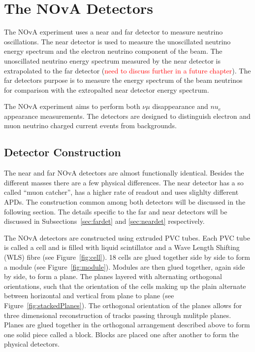 \section{The NOvA Detectors}

The NOvA experiment uses a near and far detector to measure neutrino
oscillations. The near detector is used to measure the unoscillated
neutrino energy spectrum and the electron neutrino component of the
beam. The unoscillated neutrino energy spectrum measured by the near
detector is extrapolated to the far detector (\textcolor{red}{need to
  discuss further in a future chapter}). The far detectors purpose is
to measure the energy spectrum of the beam neutrinos for comparison
with the extropalted near detector energy spectrum.

The NOvA experiment aims to perform both $\nu{\mu}$ disappearance and
$nu_e$ appearance measurements. The
detectors are designed to distinguish electron and muon neutrino
charged current events from backgrounds. 


\subsection{Detector Construction}

The near and far NOvA detectors are almost functionally
identical. Besides
the different masses there are a few physical
differences. The near detector has a so called ``muon catcher'', has a
higher rate of readout and uses slighlty different APDs. The
construction common among both detectors will be discussed in the
following section. The details specific to the far and near detectors
will be discussed in Subsections~\ref{sec:fardet} and
\ref{sec:neardet} respectively.

The NOvA detectors are constructed using extruded PVC tubes. Each PVC
tube is called a cell and is filled with liquid scintillator and a
Wave Length Shifting (WLS) fibre (see Figure~\ref{fig:cell}). 
18 cells are glued together side by side to form a module (see
Figure~\ref{fig:module}). Modules are then glued together, again side
by side,
to form a plane. The planes layered with alternating orthogonal
orientations, such that the orientation of the cells making up the
plain alternate between horizontal and vertical from plane to plane (see
Figure~\ref{fig:stackedPlanes}). The orthogonal
orientation of the planes allows for three dimensional reconstruction
of tracks passing through mulitple planes. Planes are glued together
in the orthogonal arrangement described above to form one solid piece
called a block. Blocks are placed one after another to form the
physical detectors.




